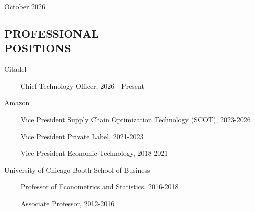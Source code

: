 \documentclass[margin,line]{res}
\begin{document}
\hfill {\sc October 2026}

\begin{resume}

\medskip



\medskip
\section{\bf PROFESSIONAL\\ POSITIONS}

{\sc Citadel}

\vspace{-.4cm}~~~~ Chief Technology Officer, 2026 - Present

\vspace{-.275cm}


{\sc Amazon}

\vspace{-.4cm}~~~~ Vice President Supply Chain Optimization Technology (SCOT), 2023-2026

\vspace{-.4cm}~~~~ Vice President Private Label, 2021-2023

\vspace{-.4cm}~~~~ Vice President Economic Technology, 2018-2021



\vspace{-.275cm}

{\sc University of Chicago Booth School of Business}

\vspace{-.4cm}~~~~ Professor of Econometrics and Statistics, 2016-2018 

\vspace{-.4cm}~~~~ Associate Professor, 2012-2016



\end{resume}
\end{document}
